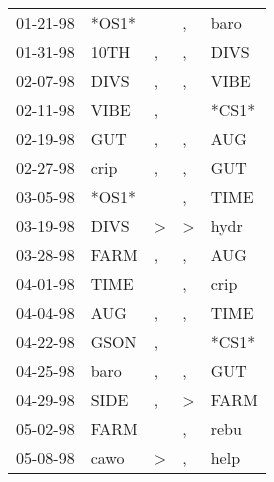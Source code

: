 \begin{supertabular}{p{0.07\textwidth}p{0.06\textwidth}p{0.02\textwidth}p{0.02\textwidth}p{0.06\textwidth}}
 01-21-98\textsuperscript{} &                   *OS1* &               &             , &  baro\textsuperscript{} \\
 01-31-98\textsuperscript{} &  10TH\textsuperscript{} &             , &             , &  DIVS\textsuperscript{} \\
 02-07-98\textsuperscript{} &  DIVS\textsuperscript{} &             , &             , &  VIBE\textsuperscript{} \\
 02-11-98\textsuperscript{} &  VIBE\textsuperscript{} &             , &               &                   *CS1* \\
 02-19-98\textsuperscript{} &   GUT\textsuperscript{} &             , &             , &   AUG\textsuperscript{} \\
 02-27-98\textsuperscript{} &  crip\textsuperscript{} &             , &             , &   GUT\textsuperscript{} \\
 03-05-98\textsuperscript{} &                   *OS1* &               &             , &  TIME\textsuperscript{} \\
 03-19-98\textsuperscript{} &  DIVS\textsuperscript{} &  \textgreater &  \textgreater &  hydr\textsuperscript{} \\
 03-28-98\textsuperscript{} &  FARM\textsuperscript{} &             , &             , &   AUG\textsuperscript{} \\
 04-01-98\textsuperscript{} &  TIME\textsuperscript{} &               &             , &  crip\textsuperscript{} \\
 04-04-98\textsuperscript{} &   AUG\textsuperscript{} &             , &             , &  TIME\textsuperscript{} \\
 04-22-98\textsuperscript{} &  GSON\textsuperscript{} &             , &               &                   *CS1* \\
 04-25-98\textsuperscript{} &  baro\textsuperscript{} &             , &             , &   GUT\textsuperscript{} \\
 04-29-98\textsuperscript{} &  SIDE\textsuperscript{} &             , &  \textgreater &  FARM\textsuperscript{} \\
 05-02-98\textsuperscript{} &  FARM\textsuperscript{} &               &             , &  rebu\textsuperscript{} \\
 05-08-98\textsuperscript{} &  cawo\textsuperscript{} &  \textgreater &             , &  help\textsuperscript{} \\

\end{supertabular}
